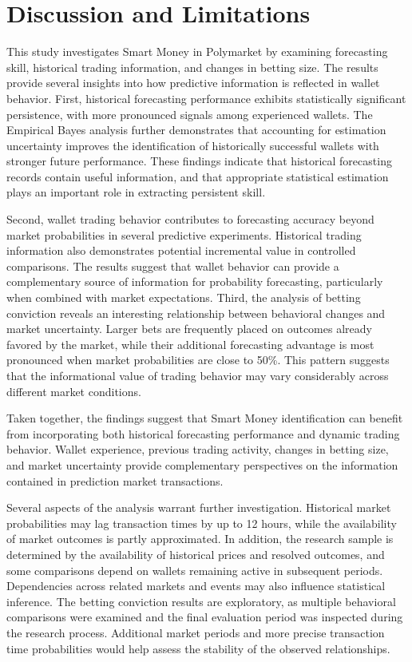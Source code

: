 \section{Discussion and Limitations}\label{sec:discussion}

This study investigates Smart Money in Polymarket by examining forecasting skill, historical trading information, and changes in betting size. The results provide several insights into how predictive information is reflected in wallet behavior. First, historical forecasting performance exhibits statistically significant persistence, with more pronounced signals among experienced wallets. The Empirical Bayes analysis further demonstrates that accounting for estimation uncertainty improves the identification of historically successful wallets with stronger future performance. These findings indicate that historical forecasting records contain useful information, and that appropriate statistical estimation plays an important role in extracting persistent skill.

Second, wallet trading behavior contributes to forecasting accuracy beyond market probabilities in several predictive experiments. Historical trading information also demonstrates potential incremental value in controlled comparisons. The results suggest that wallet behavior can provide a complementary source of information for probability forecasting, particularly when combined with market expectations. Third, the analysis of betting conviction reveals an interesting relationship between behavioral changes and market uncertainty. Larger bets are frequently placed on outcomes already favored by the market, while their additional forecasting advantage is most pronounced when market probabilities are close to 50\%. This pattern suggests that the informational value of trading behavior may vary considerably across different market conditions.

Taken together, the findings suggest that Smart Money identification can benefit from incorporating both historical forecasting performance and dynamic trading behavior. Wallet experience, previous trading activity, changes in betting size, and market uncertainty provide complementary perspectives on the information contained in prediction market transactions.

Several aspects of the analysis warrant further investigation. Historical market probabilities may lag transaction times by up to 12 hours, while the availability of market outcomes is partly approximated. In addition, the research sample is determined by the availability of historical prices and resolved outcomes, and some comparisons depend on wallets remaining active in subsequent periods. Dependencies across related markets and events may also influence statistical inference. The betting conviction results are exploratory, as multiple behavioral comparisons were examined and the final evaluation period was inspected during the research process. Additional market periods and more precise transaction time probabilities would help assess the stability of the observed relationships.

